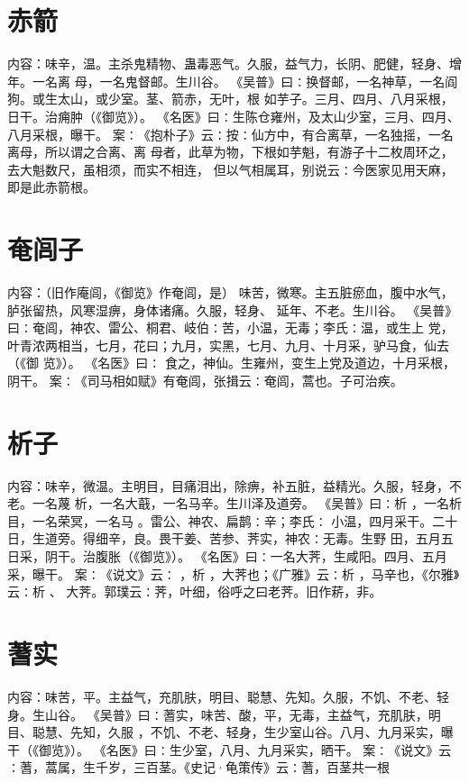 \documentclass[12pt,UTF8]{ctexbook}
\begin{document}
\section{赤箭}
内容：味辛，温。主杀鬼精物、蛊毒恶气。久服，益气力，长阴、肥健，轻身、增年。一名离 
母，一名鬼督邮。生川谷。 
《吴普》曰∶换督邮，一名神草，一名阎狗。或生太山，或少室。茎、箭赤，无叶，根 
如芋子。三月、四月、八月采根，日干。治痈肿（《御览》）。 
《名医》曰∶生陈仓雍州，及太山少室，三月、四月、八月采根，曝干。 
案∶《抱朴子》云∶按∶仙方中，有合离草，一名独摇，一名离母，所以谓之合离、离 
母者，此草为物，下根如芋魁，有游子十二枚周环之，去大魁数尺，虽相须，而实不相连， 
但以气相属耳，别说云∶今医家见用天麻，即是此赤箭根。 


\section{奄闾子}
内容：（旧作庵闾，《御览》作奄闾，是） 
味苦，微寒。主五脏瘀血，腹中水气，胪张留热，风寒湿痹，身体诸痛。久服，轻身、 
延年、不老。生川谷。 
《吴普》曰∶奄闾，神农、雷公、桐君、岐伯∶苦，小温，无毒；李氏∶温，或生上 
党，叶青浓两相当，七月，花曰；九月，实黑，七月、九月、十月采，驴马食，仙去（《御 
览》）。 
《名医》曰∶ 食之，神仙。生雍州，变生上党及道边，十月采根，阴干。 
案∶《司马相如赋》有奄闾，张揖云∶奄闾，蒿也。子可治疾。 


\section{析子}
内容：味辛，微温。主明目，目痛泪出，除痹，补五脏，益精光。久服，轻身，不老。一名蔑 
析，一名大蕺，一名马辛。生川泽及道旁。 
《吴普》曰∶析 ，一名析目，一名荣冥，一名马 。雷公、神农、扁鹊∶辛；李氏∶ 
小温，四月采干。二十日，生道旁。得细辛，良。畏干姜、苦参、荠实，神农∶无毒。生野 
田，五月五日采，阴干。治腹胀（《御览》）。 
《名医》曰∶一名大荠，生咸阳。四月、五月采，曝干。 
案∶《说文》云∶ ，析 ，大荠也；《广雅》云∶析 ，马辛也，《尔雅》云∶析 、 
大荠。郭璞云∶荠，叶细，俗呼之曰老荠。旧作菥，非。 


\section{蓍实}
内容：味苦，平。主益气，充肌肤，明目、聪慧、先知。久服，不饥、不老、轻身。生山谷。 
《吴普》曰∶蓍实，味苦、酸，平，无毒，主益气，充肌肤，明目、聪慧、先知，久服 
，不饥、不老、轻身，生少室山谷。八月、九月采实，曝干（《御览》）。 
《名医》曰∶生少室，八月、九月采实，晒干。 
案∶《说文》云∶蓍，蒿属，生千岁，三百茎。《史记·龟策传》云∶蓍，百茎共一根 
\end{document}
